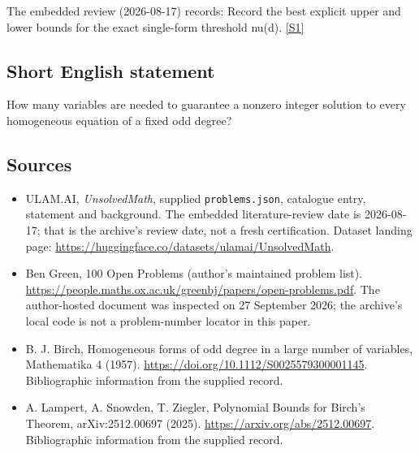 \documentclass[11pt,a4paper]{article}
\newcommand{\sref}[2]{\hyperlink{source:#1:#2}{[S#2]}}
\begin{document}
The embedded review (2026-08-17) records: Record the best explicit upper and lower bounds for the exact single-form threshold nu(d). \sref{statement}{1}

\subsection{Short English statement}

How many variables are needed to guarantee a nonzero integer solution to every homogeneous equation of a fixed odd degree?

\subsection{Sources}

{\small

\begin{itemize}

\item[\hypertarget{source:statement:1}{S1}] ULAM.AI, \emph{UnsolvedMath}, supplied \texttt{problems.json}, catalogue entry, statement and background. The embedded literature-review date is 2026-08-17; that is the archive’s review date, not a fresh certification. Dataset landing page: \url{https://huggingface.co/datasets/ulamai/UnsolvedMath}.

\item[\hypertarget{source:statement:2}{S2}] Ben Green, 100 Open Problems (author’s maintained problem list). \url{https://people.maths.ox.ac.uk/greenbj/papers/open-problems.pdf}. The author-hosted document was inspected on 27 September 2026; the archive’s local code is not a problem-number locator in this paper.

\item[\hypertarget{source:statement:3}{S3}] B. J. Birch, Homogeneous forms of odd degree in a large number of variables, Mathematika 4 (1957). \url{https://doi.org/10.1112/S0025579300001145}. Bibliographic information from the supplied record.

\item[\hypertarget{source:statement:4}{S4}] A. Lampert, A. Snowden, T. Ziegler, Polynomial Bounds for Birch's Theorem, arXiv:2512.00697 (2025). \url{https://arxiv.org/abs/2512.00697}. Bibliographic information from the supplied record.

\end{itemize}

}

\label{end:statement}
\end{document}
